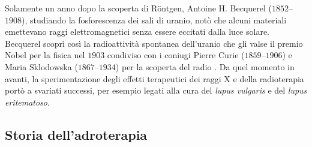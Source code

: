 \documentclass[12pt,a4paper,twoside]{report}
\begin{document}
	Solamente un anno dopo la scoperta di Röntgen, Antoine H. Becquerel ($1852$--$1908$), studiando la fosforescenza dei sali di uranio, notò che alcuni materiali emettevano raggi elettromagnetici senza essere eccitati dalla luce solare. Becquerel scoprì così la radioattività spontanea dell'uranio che gli valse il premio Nobel per la fisica nel $1903$ condiviso con i coniugi Pierre Curie ($1859$--$1906$) e Maria Sklodowska ($1867$--$1934$) per la scoperta del radio . Da quel momento in avanti, la sperimentazione degli effetti terapeutici dei raggi X e della radioterapia portò a svariati successi, per esempio legati alla cura del \textit{lupus vulgaris} e del \textit{lupus eritematoso}.
	
	\subsection{Storia dell'adroterapia}\label{storia_adroterapia}
	
\end{document}
